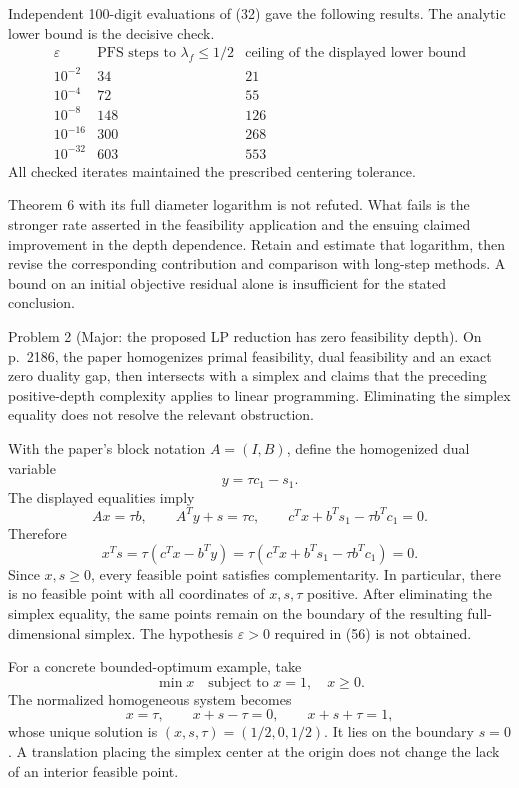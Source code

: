 \documentclass[10pt]{article}
\begin{document}
Independent 100-digit evaluations of (32) gave the following results. The analytic lower bound is the decisive check. \[\begin{array}{c|r|r}
 \varepsilon & \text{PFS steps to }\lambda_f\leq1/2
 & \text{ceiling of the displayed lower bound}\\ \hline
 10^{-2}&34&21\\
 10^{-4}&72&55\\
 10^{-8}&148&126\\
 10^{-16}&300&268\\
 10^{-32}&603&553
\end{array}\] All checked iterates maintained the prescribed centering tolerance.\par
Theorem 6 with its full diameter logarithm is not refuted. What fails is the stronger rate asserted in the feasibility application and the ensuing claimed improvement in the depth dependence. Retain and estimate that logarithm, then revise the corresponding contribution and comparison with long-step methods. A bound on an initial objective residual alone is insufficient for the stated conclusion.\par
Problem 2 (Major: the proposed LP reduction has zero feasibility depth).  On p. 2186, the paper homogenizes primal feasibility, dual feasibility and an exact zero duality gap, then intersects with a simplex and claims that the preceding positive-depth complexity applies to linear programming. Eliminating the simplex equality does not resolve the relevant obstruction.\par
With the paper’s block notation \(A=(I,B)\), define the homogenized dual variable \[y=\tau c_1-s_1.\] The displayed equalities imply \[Ax=\tau b,\qquad A^Ty+s=\tau c,\qquad
 c^Tx+b^Ts_1-\tau b^Tc_1=0.\] Therefore \[x^Ts=\tau(c^Tx-b^Ty)
     =\tau(c^Tx+b^Ts_1-\tau b^Tc_1)=0.\] Since \(x,s\geq0\), every feasible point satisfies complementarity. In particular, there is no feasible point with all coordinates of \(x,s,\tau\) positive. After eliminating the simplex equality, the same points remain on the boundary of the resulting full-dimensional simplex. The hypothesis \(\varepsilon>0\) required in (56) is not obtained.\par
For a concrete bounded-optimum example, take \[\min x\quad\text{subject to }x=1,\quad x\geq0.\] The normalized homogeneous system becomes \[x=\tau,\qquad x+s-\tau=0,\qquad x+s+\tau=1,\] whose unique solution is \((x,s,\tau)=(1/2,0,1/2)\). It lies on the boundary \(s=0\). A translation placing the simplex center at the origin does not change the lack of an interior feasible point.\par
\end{document}
